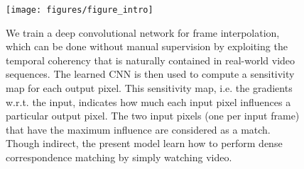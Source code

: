 \documentclass[runningheads]{llncs}
\begin{document}
\begin{figure}[t]
		\centering
		\texttt{[image: figures/figure\_intro]}
		\caption{We train a deep convolutional network for frame interpolation, which can be done without manual supervision by exploiting the temporal coherency that is naturally contained in real-world video sequences. The learned CNN is then used to compute a sensitivity map for each output pixel. This sensitivity map, i.e. the gradients w.r.t. the input, indicates how much each input pixel influences a particular output pixel. The two input pixels (one per input frame) that have the maximum influence are considered as a match. Though indirect, the present model learn how to perform dense correspondence matching by simply watching video.}
		\label{fig:introduction}
	\end{figure}
	
	

  
\end{document}
